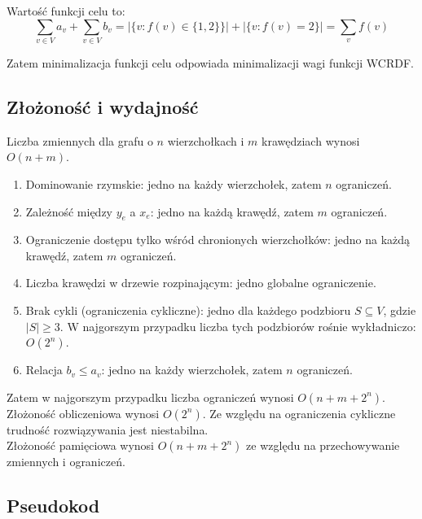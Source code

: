 Wartość funkcji celu to:
\[
\sum_{v \in V} a_v + \sum_{v \in V} b_v = |\{v : f(v) \in \{1,2\}\}| + |\{v : f(v) = 2\}|
= \sum_{v} f(v)
\]

Zatem minimalizacja funkcji celu odpowiada minimalizacji wagi funkcji WCRDF.

\subsection{Złożoność i wydajność}

Liczba zmiennych dla grafu o $n$ wierzchołkach i $m$ krawędziach wynosi $O(n+m)$.

\begin{enumerate}
    \item Dominowanie rzymskie: jedno na każdy wierzchołek, zatem $n$ ograniczeń.   
    \item Zależność między \( y_e \) a \( x_e \): jedno na każdą krawędź, zatem $m$ ograniczeń.    
    \item Ograniczenie dostępu tylko wśród chronionych wierzchołków: jedno na każdą krawędź, zatem $m$ ograniczeń.    
    \item Liczba krawędzi w drzewie rozpinającym: jedno globalne ograniczenie.  
    \item Brak cykli (ograniczenia cykliczne): jedno dla każdego podzbioru \( S \subseteq V \), gdzie \( |S| \geq 3 \). W najgorszym przypadku liczba tych podzbiorów rośnie wykładniczo: $O(2^n)$.  
    \item Relacja \( b_v \leq a_v \): jedno na każdy wierzchołek, zatem $n$ ograniczeń.
\end{enumerate}

Zatem w najgorszym przypadku liczba ograniczeń wynosi $	O(n+m+2^n)$.
Złożoność obliczeniowa wynosi $O(2^n)$. Ze względu na ograniczenia cykliczne trudność rozwiązywania jest niestabilna.\\
Złożoność pamięciowa wynosi $O(n+m+2^n)$ ze względu na przechowywanie zmiennych i ograniczeń.

\subsection{Pseudokod}


